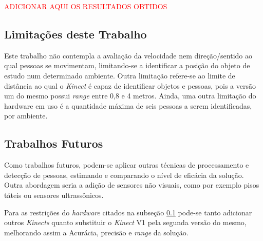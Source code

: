 \textcolor{red}{ADICIONAR AQUI OS RESULTADOS OBTIDOS}



\subsection{Limitações deste Trabalho}\label{sec:limitacoes}
Este trabalho não contempla a avaliação da velocidade nem direção/sentido ao qual pessoas se movimentam, limitando-se a identificar a posição do objeto de estudo num determinado ambiente.
Outra limitação refere-se ao limite de distância ao qual o \textit{Kinect} é capaz de identificar objetos e pessoas, pois a versão um do mesmo possui \textit{range} entre 0,8 e 4 metros. Ainda, uma outra limitação do hardware em uso é a quantidade máxima de seis pessoas a serem identificadas, por ambiente.

\subsection{Trabalhos Futuros}
Como trabalhos futuros, podem-se aplicar outras técnicas de processamento e detecção de pessoas, estimando e comparando o nível de eficácia da solução. Outra abordagem seria a adição de sensores não visuais, como por exemplo pisos táteis ou sensores ultrassônicos.

Para as restrições do \textit{hardware} citados na subseção \ref{sec:limitacoes} pode-se tanto adicionar outros \textit{Kinects} quanto substituir o \textit{Kinect} V1 pela segunda versão do mesmo, melhorando assim a Acurácia, precisão e \textit{range} da solução.

